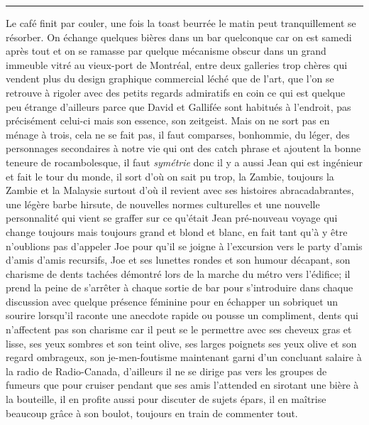 \documentclass{article}
\begin{document}
\begin{center}\noindent\rule{0.5\textwidth}{0.4pt}\end{center}


Le café finit par couler, une fois la toast beurrée le matin peut
tranquillement  se résorber. On échange quelques bières dans un bar quelconque
car on est samedi après tout et on se ramasse par quelque mécanisme obscur dans
un grand immeuble vitré au vieux-port de Montréal, entre deux galleries trop
chères qui vendent plus du design graphique commercial léché que de l'art, que
l'on se retrouve à rigoler avec des petits regards admiratifs en coin ce qui
est quelque peu étrange d'ailleurs parce que David et Gallifée sont habitués à
l'endroit, pas précisément celui-ci mais son essence, son zeitgeist. Mais on ne
sort pas en ménage à trois, cela ne se fait pas, il faut comparses, bonhommie,
du léger, des personnages secondaires
à notre vie qui ont des catch phrase et ajoutent la bonne teneure de
rocambolesque, il faut \emph{symétrie} donc il y a aussi Jean qui est ingénieur et
fait le tour du monde, il sort d'où on sait pu trop, la Zambie, toujours la
Zambie et la Malaysie surtout d'où il revient avec ses histoires
abracadabrantes, une légère barbe hirsute, de nouvelles normes culturelles et
une nouvelle personnalité qui vient se graffer sur ce qu'était Jean pré-nouveau
voyage qui change toujours mais toujours grand et blond et blanc, en fait tant
qu'à y être n'oublions pas d'appeler Joe pour qu'il se joigne à l'excursion vers
le party d'amis d'amis d'amis recursifs, Joe et  ses lunettes rondes et son humour
décapant, son charisme de dents tachées démontré lors de la marche du métro
vers l'édifice; il prend la peine de s'arrêter à chaque sortie de bar
pour s'introduire dans chaque discussion avec quelque présence féminine pour
en échapper un sobriquet un sourire lorsqu'il raconte une anecdote rapide
ou pousse un compliment, dents qui n'affectent pas son charisme
car il peut se le permettre avec ses cheveux gras et lisse, ses yeux sombres et
son teint olive, ses larges poignets ses yeux olive et son regard ombrageux,
son je-men-foutisme maintenant garni d'un concluant salaire à la radio de
Radio-Canada, d'ailleurs il ne se dirige pas vers les groupes de fumeurs
que pour cruiser pendant que ses amis l'attended en sirotant une bière à
la bouteille, il en profite aussi pour discuter de sujets épars, il en maîtrise
beaucoup grâce à son boulot, toujours en train de commenter tout.\\

\clearpage
\end{document}
